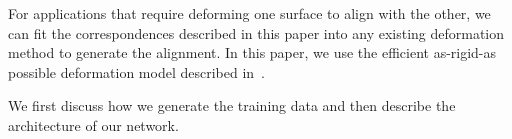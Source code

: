 \documentclass[10pt,twocolumn,letterpaper]{article}
\begin{document}
For applications that require deforming one surface to align with the other, we can fit the correspondences described in this paper into any existing deformation method to generate the alignment. In this paper, we use the efficient as-rigid-as possible deformation model described in~\cite{li09robust}.

We first discuss how we generate the training data and then describe the architecture of our network.
\end{document}
